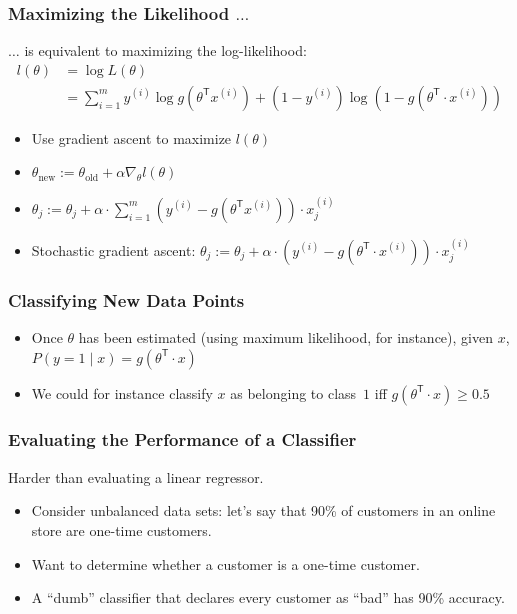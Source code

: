 \documentclass[xcolor=table]{beamer}
\newcommand{\trans}[1]{\ensuremath{#1}^{\scriptscriptstyle{\textsf{T}}}}
\begin{document}
\begin{frame}[t]
\frametitle{Maximizing the Likelihood $\ldots$}
$\ldots$ is equivalent to maximizing the log-likelihood:
\begin{equation*}
\begin{split}
l(\theta) & =  \log L(\theta) \\
          & = \sum_{i = 1}^{m} y^{(i)} \log g(\trans{\theta} x^{(i)}) 
          		+ (1 - y^{(i)}) \log(1 - g(\trans{\theta} \cdot x^{(i)}))
\end{split}
\end{equation*}

\begin{itemize}
	\item Use gradient ascent to maximize $l(\theta)$
	
	\item $\theta_{\text{new}} := \theta_{\text{old}} + \alpha \nabla_{\theta} l(\theta)$
	
	\item $\theta_j := \theta_j + \alpha \cdot \sum_{i = 1}^{m} \left ( y^{(i)} - 
					    g(\trans{\theta} x^{(i)}) \right ) \cdot x_j^{(i)}$
	\item Stochastic gradient ascent: $\theta_j := \theta_j + \alpha \cdot 
										(y^{(i)} - g(\trans{\theta} \cdot x^{(i)}) )\cdot x_j^{(i)}$
\end{itemize}
\end{frame}

\begin{frame}[t]
\frametitle{Classifying New Data Points}
\begin{itemize}
	\item Once $\theta$ has been estimated (using maximum likelihood, for instance),
			given $x$, $P(y = 1 \mid x) = g(\trans{\theta} \cdot x)$
	\item We could for instance classify $x$ as belonging to class~$1$ iff $g(\trans{\theta} \cdot x) \geq 0.5$
\end{itemize}
\end{frame}

\begin{frame}[t]
\frametitle{Evaluating the Performance of a Classifier}
Harder than evaluating a linear regressor.
\begin{itemize}
	\item Consider unbalanced data sets: let's say that 90\% of customers in an online store 
		are one-time customers.
	
	\item Want to determine whether a customer is a one-time customer.
	
	\item A ``dumb'' classifier that declares every customer as ``bad'' has 90\% accuracy.  
\end{itemize}
\end{frame}
\end{document}
